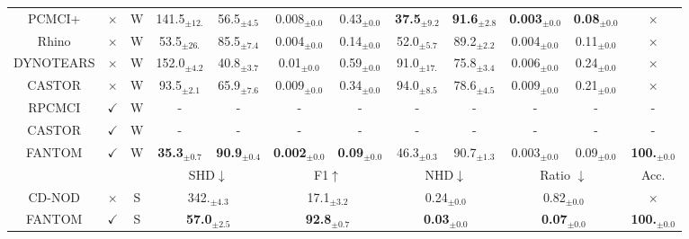 \begin{table}[H]
{\begin{tabular}{@{}ccc|cccccccc|c@{}}
PCMCI+ & $\times$ & W  & 141.5$_{\pm12.}$  & 56.5$_{\pm4.5}$   & 0.008$_{\pm0.0}$  & 0.43$_{\pm0.0}$    &
            \textbf{37.5}$_{\pm9.2}$   & \textbf{91.6}$_{\pm2.8}$   & \textbf{0.003}$_{\pm0.0}$  & \textbf{0.08}$_{\pm0.0}$  & $\times$ \\
    Rhino & $\times$ & W & 53.5$_{\pm26.}$  & 85.5$_{\pm7.4}$   & 0.004$_{\pm0.0}$  & 0.14$_{\pm0.0}$    &
            52.0$_{\pm5.7}$   & 89.2$_{\pm2.2}$   & 0.004$_{\pm0.0}$  & 0.11$_{\pm0.0}$ & $\times$ \\
    DYNOTEARS & $\times$ & W &  152.0$_{\pm4.2}$   & 40.8$_{\pm3.7}$   & 0.01$_{\pm0.0}$  & 0.59$_{\pm0.0}$    &
            91.0$_{\pm17.}$  & 75.8$_{\pm3.4}$   & 0.006$_{\pm0.0}$  & 0.24$_{\pm0.0}$ & $\times$  \\
    CASTOR & $\times$ & W & 93.5$_{\pm2.1}$   & 65.9$_{\pm7.6}$   & 0.009$_{\pm0.0}$  & 0.34$_{\pm0.0}$    &
            94.0$_{\pm8.5}$   & 78.6$_{\pm4.5}$   & 0.009$_{\pm0.0}$  & 0.21$_{\pm0.0}$ & $\times$  \\
    \midrule
    RPCMCI & $\checkmark$ & W & - & - & - & - & - & - & - & - & -  \\
    CASTOR & $\checkmark$ & W & - & - & - & - & - & - & - & - & -  \\
    \rowcolor{gray!20} FANTOM & $\checkmark$  & W & \textbf{35.3}$_{\pm0.7}$ & \textbf{90.9}$_{\pm0.4}$ & \textbf{0.002}$_{\pm0.0}$ & \textbf{0.09}$_{\pm0.0}$  & 46.3$_{\pm0.3}$ & 90.7$_{\pm1.3}$ & 0.003$_{\pm0.0}$& 0.09$_{\pm0.0}$& \textbf{100.}$_{\pm0.0}$  \\
    \midrule
      &   &  &\multicolumn{2}{c}{SHD$\downarrow$ } &\multicolumn{2}{c}{F1$\uparrow$} & \multicolumn{2}{c}{NHD$\downarrow$} & \multicolumn{2}{c|}{Ratio $\downarrow$ } & Acc.\\
    \midrule
    CD-NOD & $\times$ & S & \multicolumn{2}{c}{342.$_{\pm4.3}$} &\multicolumn{2}{c}{17.1$_{\pm3.2}$} & \multicolumn{2}{c}{0.24$_{\pm0.0}$} & \multicolumn{2}{c|}{0.82$_{\pm0.0}$} & $\times$ \\
    \rowcolor{gray!20} FANTOM & $\checkmark$ & S & \multicolumn{2}{c}{\textbf{57.0}$_{\pm2.5}$} &\multicolumn{2}{c}{\textbf{92.8}$_{\pm0.7}$} & \multicolumn{2}{c}{\textbf{0.03}$_{\pm0.0}$} & \multicolumn{2}{c|}{\textbf{0.07}$_{\pm0.0}$} & \textbf{100.}$_{\pm0.0}$  \\ \bottomrule
\end{tabular}}
\end{table}

